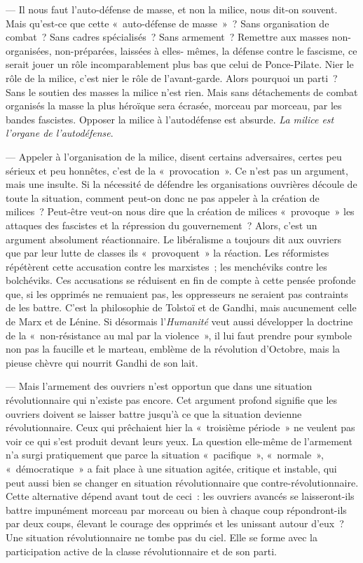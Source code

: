 \documentclass[french,twoside]{book} %
\begin{document}
 — Il nous faut l’auto-défense de masse, et non la milice, nous dit-on souvent. Mais qu’est-ce que cette « auto-défense de masse » ? Sans organisation de combat ? Sans cadres spécialisés ? Sans armement ? Remettre aux masses non-organisées, non-préparées, laissées à elles- mêmes, la défense contre le fascisme, ce serait jouer un rôle incomparablement plus bas que celui de Ponce-Pilate. Nier le rôle de la milice, c’est nier le rôle de l’avant-garde. Alors pourquoi un parti ? Sans le soutien des masses la milice n’est rien. Mais sans détachements de combat organisés la masse la plus héroïque sera écrasée, morceau par morceau, par les bandes fascistes. Opposer la milice à l’autodéfense est absurde. \emph{La milice est l’organe de l’autodéfense}.\par
— Appeler à l’organisation de la milice, disent certains adversaires, certes peu sérieux et peu honnêtes, c’est de la « provocation ». Ce n’est pas un argument, mais une insulte. Si la nécessité de défendre les organisations ouvrières découle de toute la situation, comment peut-on donc ne pas appeler à la création de milices ? Peut-être veut-on nous dire que la création de milices « provoque » les attaques des fascistes et la répression du gouvernement ? Alors, c’est un argument absolument réactionnaire. Le libéralisme a toujours dit aux ouvriers que par leur lutte de classes ils « provoquent » la réaction. Les réformistes répétèrent cette accusation contre les marxistes ; les menchéviks contre les bolchéviks. Ces accusations se réduisent en fin de compte à cette pensée profonde que, si les opprimés ne remuaient pas, les oppresseurs ne seraient pas contraints de les battre. C’est la philosophie de Tolstoï et de Gandhi, mais aucunement celle de Marx et de Lénine. Si désormais l’\emph{Humanité} veut aussi développer la doctrine de la « non-résistance au mal par la violence », il lui faut prendre pour symbole non pas la faucille et le marteau, emblème de la révolution d’Octobre, mais la pieuse chèvre qui nourrit Gandhi de son lait.\par
— Mais l’armement des ouvriers n’est opportun que dans une situation révolutionnaire qui n’existe pas encore. Cet argument profond signifie que les ouvriers doivent se laisser battre jusqu’à ce que la situation devienne révolutionnaire.  Ceux qui prêchaient hier la « troisième période » ne veulent pas voir ce qui s’est produit devant leurs yeux. La question elle-même de l’armement n’a surgi pratiquement que parce la situation « pacifique », « normale », « démocratique » a fait place à une situation agitée, critique et instable, qui peut aussi bien se changer en situation révolutionnaire que contre-révolutionnaire. Cette alternative dépend avant tout de ceci : les ouvriers avancés se laisseront-ils battre impunément morceau par morceau ou bien à chaque coup répondront-ils par deux coups, élevant le courage des opprimés et les unissant autour d’eux ? Une situation révolutionnaire ne tombe pas du ciel. Elle se forme avec la participation active de la classe révolutionnaire et de son parti.\par
\end{document}
